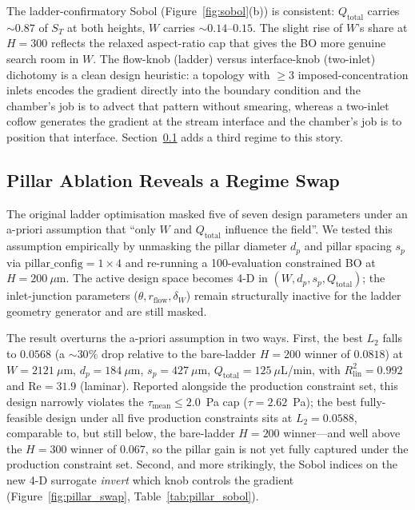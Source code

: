 \documentclass[12pt]{article}
\begin{document}
The ladder-confirmatory Sobol (Figure~\ref{fig:sobol}(b)) is consistent: $Q_{\text{total}}$ carries $\sim 0.87$ of $S_T$ at both heights, $W$ carries $\sim 0.14$--$0.15$. The slight rise of $W$'s share at $H = 300$ reflects the relaxed aspect-ratio cap that gives the BO more genuine search room in $W$. The flow-knob (ladder) versus interface-knob (two-inlet) dichotomy is a clean design heuristic: a topology with $\geq 3$ imposed-concentration inlets encodes the gradient directly into the boundary condition and the chamber's job is to advect that pattern without smearing, whereas a two-inlet coflow generates the gradient at the stream interface and the chamber's job is to position that interface. Section~\ref{sec:pillar_ablation} adds a third regime to this story.

\subsection{Pillar Ablation Reveals a Regime Swap}
\label{sec:pillar_ablation}
The original ladder optimisation masked five of seven design parameters under an a-priori assumption that ``only $W$ and $Q_{\text{total}}$ influence the field''. We tested this assumption empirically by unmasking the pillar diameter $d_p$ and pillar spacing $s_p$ via $\text{pillar\_config} = 1\!\times\!4$ and re-running a 100-evaluation constrained BO at $H = 200~\mu$m. The active design space becomes 4-D in $(W, d_p, s_p, Q_{\text{total}})$; the inlet-junction parameters ($\theta, r_{\text{flow}}, \delta_W$) remain structurally inactive for the ladder geometry generator and are still masked.

The result overturns the a-priori assumption in two ways. First, the best $L_2$ falls to $0.0568$ (a $\sim 30\%$ drop relative to the bare-ladder $H = 200$ winner of $0.0818$) at $W = 2121~\mu$m, $d_p = 184~\mu$m, $s_p = 427~\mu$m, $Q_{\text{total}} = 125~\mu$L/min, with $R^2_{\text{lin}} = 0.992$ and $\text{Re} = 31.9$ (laminar). Reported alongside the production constraint set, this design narrowly violates the $\tau_{\text{mean}} \leq 2.0$~Pa cap ($\tau = 2.62$~Pa); the best fully-feasible design under all five production constraints sits at $L_2 = 0.0588$, comparable to, but still below, the bare-ladder $H = 200$ winner---and well above the $H = 300$ winner of $0.067$, so the pillar gain is not yet fully captured under the production constraint set. Second, and more strikingly, the Sobol indices on the new 4-D surrogate \emph{invert} which knob controls the gradient (Figure~\ref{fig:pillar_swap}, Table~\ref{tab:pillar_sobol}).
\end{document}
